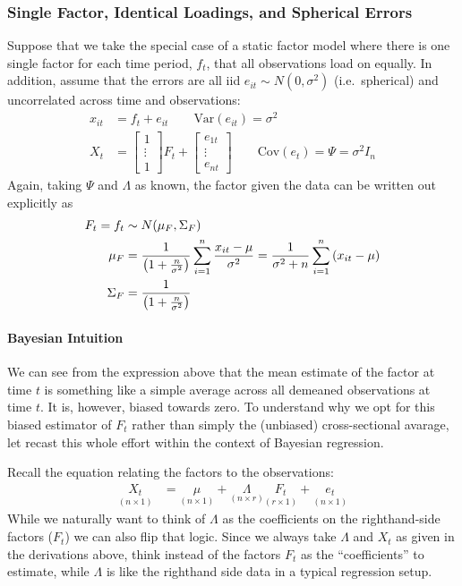 \documentclass[12pt]{article}
\theoremstyle{plain}
\theoremstyle{definition}
\theoremstyle{remark}
\begin{document}
\subsubsection{Single Factor, Identical Loadings, and Spherical Errors}

Suppose that we take the special case of a static factor model where
there is one single factor for each time period, $f_t$, that all
observations load on equally. In addition, assume that the errors are
all iid $e_{it}\sim N(0, \sigma^2)$ (i.e.\ spherical) and uncorrelated
across time and observations:
\begin{align*}
  x_{it} &= f_{t} + e_{it}\qquad \text{Var}(e_{it})=\sigma^2\\
  X_t &= \begin{bmatrix} 1 \\ \vdots \\ 1 \end{bmatrix} F_t +
    \begin{bmatrix} e_{1t} \\ \vdots \\ e_{nt} \end{bmatrix}
    \qquad \text{Cov}(e_t) = \Psi = \sigma^2 I_n
\end{align*}
Again, taking $\Psi$ and $\Lambda$ as known, the factor given the data
can be written out explicitly as
\begin{align}
  F_t = f_t &\sim N(\mu_F, \Sigma_F)\label{ex1}\\
  \mu_F &= \frac{1}{\left(1+\frac{n}{\sigma^2}\right)}
  \sum^n_{i=1} \frac{x_{it}-\mu}{\sigma^2}
  = \frac{1}{\sigma^2+n} \sum^n_{i=1} \left(x_{it}-\mu\right)\notag\\
  \Sigma_F &= \frac{1}{\left(1+\frac{n}{\sigma^2}\right)}\notag
\end{align}

\paragraph{Bayesian Intuition} We can see from the expression above that
the mean estimate of the factor at time $t$ is something like a simple
average across all demeaned observations at time $t$.  It is, however,
biased towards zero. To understand why we opt for this biased estimator
of $F_t$ rather than simply the (unbiased) cross-sectional avarage,
let recast this whole effort within the context of Bayesian regression.

Recall the equation relating the factors to the observations:
\begin{align}
  \underset{(n \times 1)}{X_t} &= \underset{(n \times 1)}{\mu} +
    \underset{(n \times r)}{\Lambda} \underset{(r \times 1)}{F_t}
    + \underset{(n \times 1)}{e_t}
    \label{regintuition}
\end{align}
While we naturally want to think of $\Lambda$ as the coefficients on the
righthand-side factors ($F_t$) we can also flip that logic. Since we
always take $\Lambda$ and $X_t$ as given in the derivations above, think
instead of the factors $F_t$ as the ``coefficients'' to estimate,
while $\Lambda$ is like the righthand side data in a typical regression
setup.
\end{document}
